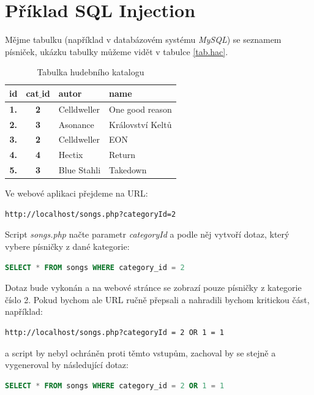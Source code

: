 \documentclass[12pt, a4paper]{report}
\begin{document}
\section{Příklad SQL Injection}
Mějme tabulku (například v databázovém systému \textit{MySQL}) se seznamem písniček, ukázku tabulky můžeme vidět v tabulce \ref{tab.hac}.
\begin{table}[!h]
\centering
\begin{tabular}{|c|c|l|l|}
\hline
\bf id & \bf cat$\_$id & \bf autor & \bf name \\
\hline
\hline
\bf 1. & \bf 2 & Celldweller & One good reason \\
\hline
\bf 2. & \bf 3 & Asonance & Království Keltů \\
\hline
\bf 3. & \bf 2 & Celldweller & EON \\
\hline
\bf 4. & \bf 4 & Hectix & Return \\
\hline
\bf 5. & \bf 3 & Blue Stahli & Takedown \\
\hline
\end{tabular}
\label{obr.hac}
\caption{Tabulka hudebního katalogu}
\end{table}
\newline
Ve webové aplikaci přejdeme na URL:
\begin{lstlisting}[label=web_app_url_1,language=HTML, caption=URL webové aplikace]
http://localhost/songs.php?categoryId=2
\end{lstlisting}

Script \textit{songs.php} načte parametr \textit{categoryId} a podle něj vytvoří dotaz, který vybere písničky z dané kategorie:

\begin{lstlisting}[label=web_app_url_2,language=SQL, caption=Vytvořený SQL dotaz]
SELECT * FROM songs WHERE category_id = 2
\end{lstlisting}

Dotaz bude vykonán a na webové stránce se zobrazí pouze písničky z kategorie číslo 2. Pokud bychom ale URL ručně přepsali a nahradili bychom kritickou část, například:
\begin{lstlisting}[label=web_app_url_3,language=HTML, caption=Ručně upravené URL]
http://localhost/songs.php?categoryId = 2 OR 1 = 1
\end{lstlisting}

a script by nebyl ochráněn proti těmto  vstupům, zachoval by se stejně a vygeneroval by následující dotaz:
\begin{lstlisting}[label=web_app_url_4,language=SQL, caption=Vygenerovaný SQL dotaz z upraveného URL]
SELECT * FROM songs WHERE category_id = 2 OR 1 = 1
\end{lstlisting}
\end{document}
